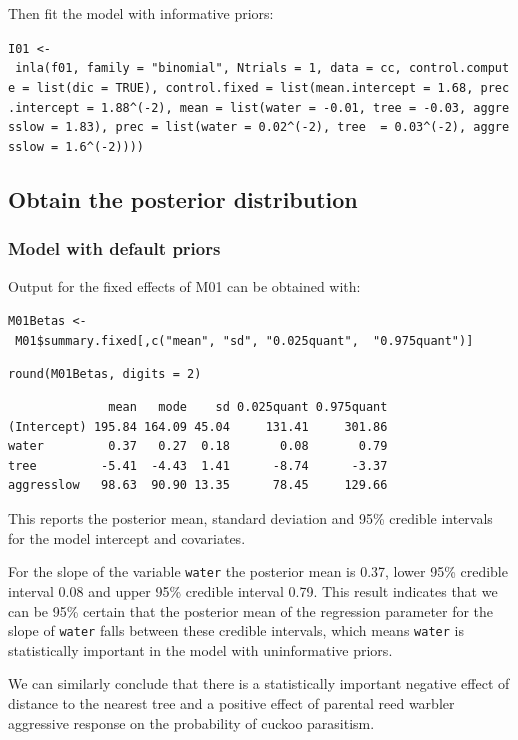 \documentclass[
]{book}
\begin{document}
Then fit the model with informative priors:

\texttt{I01\ \textless{}-\ inla(f01,\ family\ =\ "binomial",\ Ntrials\ =\ 1,\ data\ =\ cc,\ control.compute\ =\ list(dic\ =\ TRUE),\ control.fixed\ =\ list(mean.intercept\ =\ 1.68,\ prec.intercept\ =\ 1.88\^{}(-2),\ mean\ =\ list(water\ =\ -0.01,\ tree\ =\ -0.03,\ aggresslow\ =\ 1.83),\ prec\ =\ list(water\ =\ 0.02\^{}(-2),\ tree\ \ =\ 0.03\^{}(-2),\ aggresslow\ =\ 1.6\^{}(-2))))}

\hypertarget{bern-post-dist}{%
\subsection{Obtain the posterior distribution}\label{bern-post-dist}}

\hypertarget{model-with-default-priors-1}{%
\subsubsection{Model with default priors}\label{model-with-default-priors-1}}

Output for the fixed effects of M01 can be obtained with:

\texttt{M01Betas\ \textless{}-\ M01\$summary.fixed{[},c("mean",\ "sd",\ "0.025quant",\ \ "0.975quant"){]}}

\texttt{round(M01Betas,\ digits\ =\ 2)}

\begin{verbatim}
              mean   mode    sd 0.025quant 0.975quant
(Intercept) 195.84 164.09 45.04     131.41     301.86
water         0.37   0.27  0.18       0.08       0.79
tree         -5.41  -4.43  1.41      -8.74      -3.37
aggresslow   98.63  90.90 13.35      78.45     129.66
\end{verbatim}

This reports the posterior mean, standard deviation and 95\% credible intervals for the model intercept and covariates.

For the slope of the variable \texttt{water} the posterior mean is 0.37, lower 95\% credible interval 0.08 and upper 95\% credible interval 0.79. This result indicates that we can be 95\% certain that the posterior mean of the regression parameter for the slope of \texttt{water} falls between these credible intervals, which means \texttt{water} is statistically important in the model with uninformative priors.

We can similarly conclude that there is a statistically important negative effect of distance to the nearest tree and a positive effect of parental reed warbler aggressive response on the probability of cuckoo parasitism.
\end{document}
